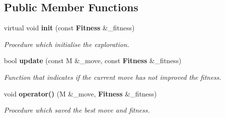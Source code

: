 \subsection*{Public Member Functions}
\begin{CompactItemize}
\item 
virtual void {\bf init} (const {\bf Fitness} \&\_\-fitness)
\begin{CompactList}\small\item\em Procedure which initialise the exploration. \item\end{CompactList}\item 
bool {\bf update} (const M \&\_\-move, const {\bf Fitness} \&\_\-fitness)
\begin{CompactList}\small\item\em Function that indicates if the current move has not improved the fitness. \item\end{CompactList}\item 
void {\bf operator()} (M \&\_\-move, {\bf Fitness} \&\_\-fitness)
\begin{CompactList}\small\item\em Procedure which saved the best move and fitness. \item\end{CompactList}\end{CompactItemize}
